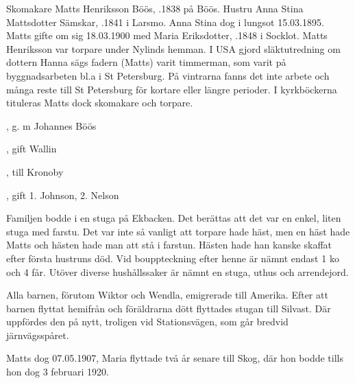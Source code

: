 %
Skomakare Matts Henriksson Böös, .1838 på Böös. Hustru Anna Stina Mattsdotter Sämskar, .1841 i Larsmo. Anna Stina dog i lungsot 15.03.1895. Matts gifte om sig 18.03.1900 med Maria Eriksdotter, .1848 i Socklot. Matts Henriksson var torpare under Nylinds hemman. I USA gjord släktutredning om dottern Hanna sägs fadern (Matts) varit timmerman, som varit på byggnadsarbeten bl.a i St Petersburg. På vintrarna fanns det inte arbete och många reste till St Petersburg för kortare eller längre perioder. I kyrkböckerna tituleras Matts dock skomakare och torpare.
\begin{jhchildren}
  \item {}
  \item {}, g. m Johannes Böös
  \item {}, gift Wallin
  \item {}
  \item {}, till Kronoby
  \item {}
  \item {}, gift 1. Johnson, 2. Nelson
\end{jhchildren}
Familjen bodde i en stuga på Ekbacken. Det berättas att det var en enkel, liten stuga med farstu. Det var inte så vanligt att torpare hade häst, men en häst hade Matts och hästen hade man att stå i farstun. Hästen hade han kanske skaffat efter första hustruns död. Vid bouppteckning efter henne är nämnt endast 1 ko och 4 får. Utöver diverse hushållssaker är nämnt en stuga, uthus och arrendejord.

Alla barnen, förutom Wiktor och Wendla, emigrerade till Amerika. Efter att barnen flyttat hemifrån och föräldrarna dött flyttades stugan till Silvast. Där uppfördes den på nytt, troligen vid Stationsvägen, som går bredvid järnvägsspåret.

Matts dog 07.05.1907, Maria flyttade två år senare till Skog, där hon bodde tills hon dog 3 februari 1920.



